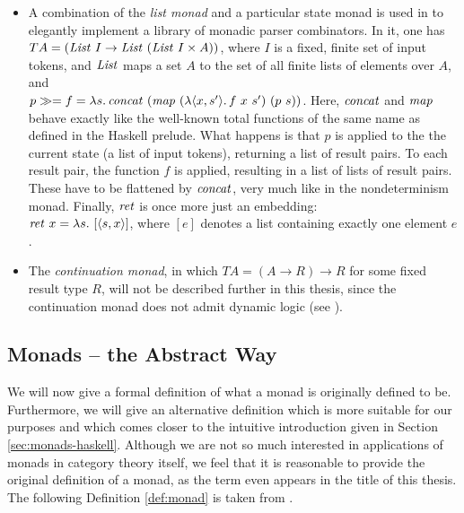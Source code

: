 \begin{itemize}
\item A combination of the \emph{list monad} and a particular state monad is
  used in \cite{HuttonMeijer96} to elegantly implement a library of monadic
  parser combinators. In it, one has\\
  $T A = (\mathit{List}\ I \to \mathit{List}\ (\mathit{List}\ I \times A))$, where $I$ is
  a fixed, finite set of input tokens, and $\mathit{List}$ maps a set $A$ to the
  set
  of all finite lists of elements over $A$, and \\
  $p \gg= f = \LambdaTerm{s}{\op{concat}\ (\op{map}\ %
    (\LambdaTerm{\langle x,s'\rangle}{f\ x\ s'})\ (p\ s))}$. Here, $\mathit{concat}$ and
  $\mathit{map}$ behave exactly like the well-known total functions of the same
  name as defined in the Haskell prelude. What happens is that $p$ is applied to
  the the current state (a list of input tokens), returning a list of result
  pairs. To each result pair, the function $f$ is applied, resulting in a list
  of lists of result pairs. These have to be flattened by $\mathit{concat}$,
  very much like in the nondeterminism monad. Finally, $\mathit{ret}$ is once more just
  an embedding:\\
  $\mathit{ret}~x = {\lambda s.\,\left[\langle s, x\rangle\right]}$, where $[e]$ denotes a
  list containing exactly one element $e$.

\item The \emph{continuation monad}, in which $T A = (A \to R) \to R$ for some fixed
  result type $R$, will not be described further in this thesis, since the
  continuation monad does not admit dynamic logic (see
  \cite{SchroederMossakowski:PDL}). 
\end{itemize}


\subsection{Monads -- the Abstract Way}
\label{sec:monads-categ-theory}

We will now give a formal definition of what a monad is originally defined to
be. Furthermore, we will give an alternative definition which is more suitable
for our purposes and which comes closer to the intuitive introduction given in
Section \ref{sec:monads-haskell}. Although we are not so much interested in
applications of monads in category theory itself, we feel that it is reasonable
to provide the original definition of a monad, as the term even appears in the
title of this thesis. The following Definition \ref{def:monad} is taken from
\cite[Chapter~VI, p.~137]{MacLane98}.

